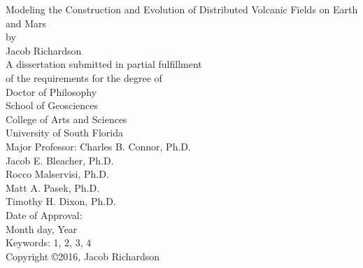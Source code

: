\begin{titlepage}
\begin{center}
\singlespacing
{ \vspace*{\baselineskip} }
{ \vspace*{\baselineskip} }
{ \vspace*{\baselineskip} }
{ \vspace*{\baselineskip} }
Modeling the Construction and Evolution of Distributed Volcanic Fields on Earth and Mars\\
{ \vspace*{\baselineskip} }
{ \vspace*{\baselineskip} }
{ \vspace*{\baselineskip} }
by\\
{ \vspace*{\baselineskip} }
{ \vspace*{\baselineskip} }
{ \vspace*{\baselineskip} }
Jacob Richardson\\
{ \vspace*{\baselineskip} }
{ \vspace*{\baselineskip} }
{ \vspace*{\baselineskip} }
{ \vspace*{\baselineskip} }
A dissertation submitted in partial fulfillment\\
of the requirements for the degree of\\
Doctor of Philosophy\\
School of Geosciences\\
College of Arts and Sciences\\
University of South Florida\\
{ \vspace*{\baselineskip} }
{ \vspace*{\baselineskip} }
{ \vspace*{\baselineskip} }
Major Professor: Charles B. Connor, Ph.D.\\
Jacob E. Bleacher, Ph.D.\\
Rocco Malservisi, Ph.D.\\
Matt A. Pasek, Ph.D.\\
Timothy H. Dixon, Ph.D.\\
{ \vspace*{\baselineskip} }
{ \vspace*{\baselineskip} }
Date of Approval:\\
Month day, Year\\
{ \vspace*{\baselineskip} }
{ \vspace*{\baselineskip} }
{ \vspace*{\baselineskip} }
Keywords: 1, 2, 3, 4\\
{ \vspace*{\baselineskip} }
Copyright \copyright\hspace{1mm}2016, Jacob Richardson\\
\end{center}
\end{titlepage}
